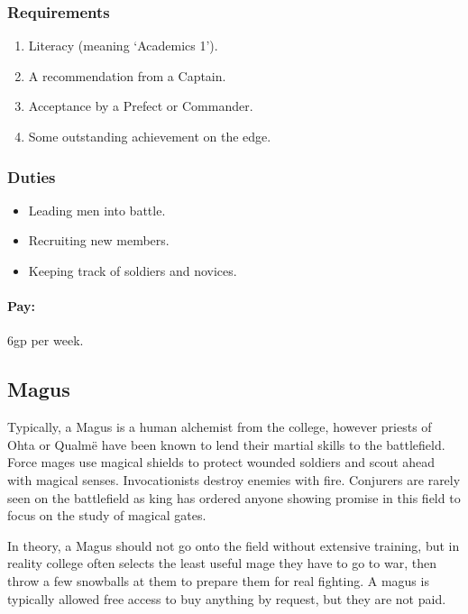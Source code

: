 \begin{multicols}{2}
\subsubsection{Requirements}

\begin{enumerate}
  \item
  Literacy (meaning `Academics 1').
  \item
  A recommendation from a Captain.
  \item
  Acceptance by a Prefect or Commander.
  \item
  Some outstanding achievement on the \gls{edge}.
\end{enumerate}

\subsubsection{Duties}

\begin{itemize}
  \item
  Leading men into battle.
  \item
  Recruiting new members.
  \item
  Keeping track of soldiers and novices.
\end{itemize}

\paragraph{Pay:} 6gp per week.

\subsection{Magus}

Typically, a Magus is a human alchemist from the \gls{college}, however priests of Ohta or Qualm\"e have been known to lend their martial skills to the battlefield.
Force mages use magical shields to protect wounded soldiers and scout ahead with magical senses.
Invocationists destroy enemies with fire.
Conjurers are rarely seen on the battlefield as \gls{king} has ordered anyone showing promise in this field to focus on the study of magical gates.

In theory, a Magus should not go onto the field without extensive training, but in reality \gls{college} often selects the least useful mage they have to go to war, then throw a few snowballs at them to prepare them for real fighting.
A magus is typically allowed free access to buy anything by request, but they are not paid.


\end{multicols}
